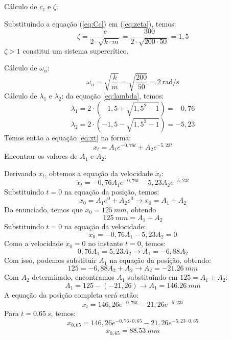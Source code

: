 
\resol

Cálculo de $c_c$ e $\zeta$:

Substituindo a equação (\ref{eq:Cc}) em (\ref{eq:zeta}), temos:
\[
\zeta = \frac{c}{2\cdot \sqrt{k\cdot m}} = \frac{300}{2\cdot \sqrt{200\cdot 50}} = 1,5
\]
$\zeta > 1$ constitui um sistema supercrítico.

Cálculo de $\omega_n$:
\[
\omega_n = \sqrt{\frac{k}{m}} = \sqrt{\frac{200}{50}} =
\SI{2}{\radian\per\second}
\]
Cálculo de $\lambda_1$ e $\lambda_2$:
da equação \ref{eq:lambda}, temos:
\[
    \lambda_1 = 2\cdot (-1,5 + \sqrt{1,5^2-1}) = -0,76
\]
\[
    \lambda_2 = 2\cdot (-1,5 - \sqrt{1,5^2-1}) = -5,23
\]
Temos então a equação \ref{eq:xt} na forma:
\[
x_t = A_1 e^{-0,76 t} + A_2 e^{-5,23 t}
\]
Encontrar os valores de $A_1$ e $A_2$:

Derivando $x_t$, obtemos a equação da velocidade $\dot x_t$:
\[
\dot x_t = -0,76 A_1 e^{-0,76 t}  -5,23 A_2 e^{-5,23 t}
\]
Substituindo $t=0$ na equação da posição, temos:
\[
x_0 = A_1 e^{0} + A_2 e^{0} \to x_0 = A_1 + A_2
\]
Do enunciado, temos que $x_0 = \SI{125}{mm}$, obtendo
\[
\SI{125}{mm} = A_1 + A_2
\]
Substituindo $t=0$ na equação da velocidade:
\[
\dot x_0 = -0,76A_1 - 5,23A_2 = 0
\]
Como a velocidade $\dot x_0 = 0$ no instante $t=0$, temos:
 \[
 0,76A_1 = 5,23A_2 \to A_1 = -6,88A_2
 \]
 Com isso, podemos substituir $A_1$ na equação da posição, obtendo:
\[
125 = -6,88A_2 + A_2 \to A_2 = \SI{-21,26}{mm}
\]
Com $A_2$ determinado, encontramos $A_1$ substituindo em $125 = A_1 + A_2$:
\[
    A_1 = 125 - (-21,26) \to A_1 = \SI{146,26}{mm}
\]
A equação da posição completa será então:
\[
x_t = 146,26 e^{-0,76 t} - 21,26 e^{-5,23 t}
\]
Para $t=\SI{0,65}{s}$, temos:
\[
    x_{0,65} = 146,26 e^{-0,76 \cdot 0,65} - 21,26 e^{-5,23\cdot 0,65}
\]
\[
x_{0,65} = \SI{88,53}{mm}
\]
